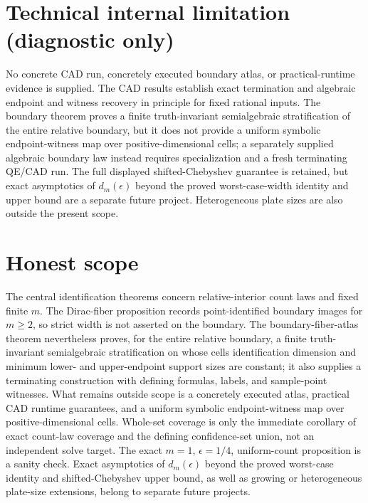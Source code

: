 \documentclass{article}
\begin{document}
\section*{Technical internal limitation (diagnostic only)}

No concrete CAD run, concretely executed boundary atlas, or practical-runtime evidence is supplied. The CAD results establish exact termination and algebraic endpoint and witness recovery in principle for fixed rational inputs. The boundary theorem proves a finite truth-invariant semialgebraic stratification of the entire relative boundary, but it does not provide a uniform symbolic endpoint-witness map over positive-dimensional cells; a separately supplied algebraic boundary law instead requires specialization and a fresh terminating QE/CAD run. The full displayed shifted-Chebyshev guarantee is retained, but exact asymptotics of \(d_m(\epsilon)\) beyond the proved worst-case-width identity and upper bound are a separate future project. Heterogeneous plate sizes are also outside the present scope.

\section{Honest scope}

The central identification theorems concern relative-interior count laws and fixed finite \(m\). The Dirac-fiber proposition records point-identified boundary images for \(m\geq2\), so strict width is not asserted on the boundary. The boundary-fiber-atlas theorem nevertheless proves, for the entire relative boundary, a finite truth-invariant semialgebraic stratification on whose cells identification dimension and minimum lower- and upper-endpoint support sizes are constant; it also supplies a terminating construction with defining formulas, labels, and sample-point witnesses. What remains outside scope is a concretely executed atlas, practical CAD runtime guarantees, and a uniform symbolic endpoint-witness map over positive-dimensional cells. Whole-set coverage is only the immediate corollary of exact count-law coverage and the defining confidence-set union, not an independent solve target. The exact \(m=1\), \(\epsilon=1/4\), uniform-count proposition is a sanity check. Exact asymptotics of \(d_m(\epsilon)\) beyond the proved worst-case identity and shifted-Chebyshev upper bound, as well as growing or heterogeneous plate-size extensions, belong to separate future projects.
\end{document}
